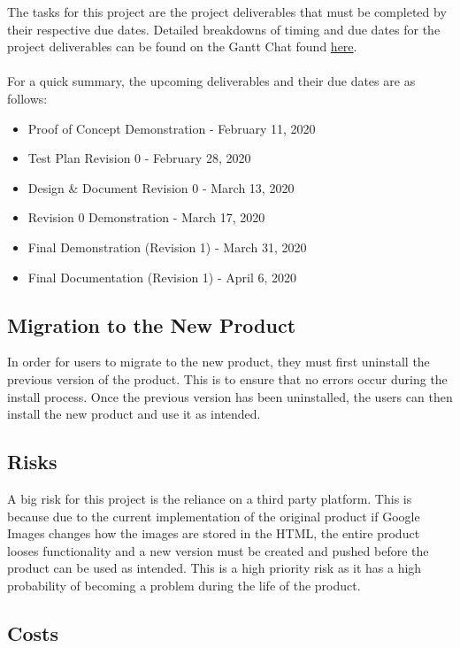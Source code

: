 \documentclass[12pt, titlepage]{article}
\begin{document}
The tasks for this project are the project deliverables that must be completed by their respective due dates. Detailed breakdowns of timing and due dates for the project deliverables can be found on the Gantt Chat found \href{https://gitlab.cas.mcmaster.ca/guinnesj/google-images-downloader/blob/master/ProjectSchedule/Gantt-Chart.pdf}{here}. 
\\ \\
For a quick summary, the upcoming deliverables and their due dates are as follows:
\begin{itemize}
    \item Proof of Concept Demonstration - February 11, 2020
    \item Test Plan Revision 0 - February 28, 2020
    \item Design \& Document Revision 0 - March 13, 2020
    \item Revision 0 Demonstration - March 17, 2020
    \item Final Demonstration (Revision 1) - March 31, 2020
    \item Final Documentation (Revision 1) - April 6, 2020
\end{itemize}

\subsection{Migration to the New Product}

In order for users to migrate to the new product, they must first uninstall the previous version of the product. This is to ensure that no errors occur during the install process. Once the previous version has been uninstalled, the users can then install the new product and use it as intended.

\subsection{Risks}

A big risk for this project is the reliance on a third party platform. This is because due to the current implementation of the original product if Google Images changes how the images are stored in the HTML, the entire product looses functionality and a new version must be created and pushed before the product can be used as intended. This is a high priority risk as it has a high probability of becoming a problem during the life of the product.

\subsection{Costs}
\end{document}
